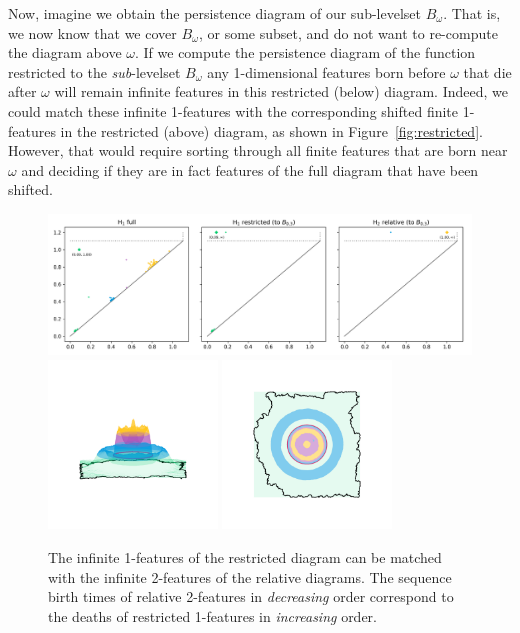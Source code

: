 Now, imagine we obtain the persistence diagram of our sub-levelset $B_\omega$.
That is, we now know that we cover $B_\omega$, or some subset, and do not want to re-compute the diagram above $\omega$.
If we compute the persistence diagram of the function restricted to the \emph{sub}-levelset $B_\omega$ any 1-dimensional features born before $\omega$ that die after $\omega$ will remain infinite features in this restricted (below) diagram.
Indeed, we could match these infinite 1-features with the corresponding shifted finite 1-features in the restricted (above) diagram, as shown in Figure~\ref{fig:restricted}.
However, that would require sorting through all finite features that are born near $\omega$ and deciding if they are in fact features of the full diagram that have been shifted.

\begin{figure}[htbp]\label{fig:relative2}
  \centering
  \includegraphics[width=\textwidth]{scripts/figures/relative/dgm-0_1.png}
  \includegraphics[trim=500 800 500 800, clip, width=0.4\textwidth]{scripts/figures/relative/surf_side-0_1.png}
  \includegraphics[trim=500 500 500 500, clip, width=0.4\textwidth]{scripts/figures/relative/surf_top-0_1.png}
  \caption{The infinite 1-features of the restricted diagram can be matched with the infinite 2-features of the relative diagrams.
  The sequence birth times of relative 2-features in \emph{decreasing} order correspond to the deaths of restricted 1-features in \emph{increasing} order.}
\end{figure}

